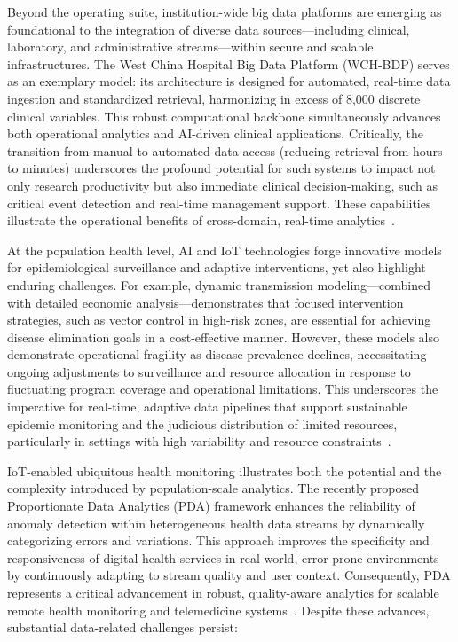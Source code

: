 \documentclass[sigconf]{acmart}
\begin{document}
Beyond the operating suite, institution-wide big data platforms are emerging as foundational to the integration of diverse data sources—including clinical, laboratory, and administrative streams—within secure and scalable infrastructures. The West China Hospital Big Data Platform (WCH-BDP) serves as an exemplary model: its architecture is designed for automated, real-time data ingestion and standardized retrieval, harmonizing in excess of 8,000 discrete clinical variables. This robust computational backbone simultaneously advances both operational analytics and AI-driven clinical applications. Critically, the transition from manual to automated data access (reducing retrieval from hours to minutes) underscores the profound potential for such systems to impact not only research productivity but also immediate clinical decision-making, such as critical event detection and real-time management support. These capabilities illustrate the operational benefits of cross-domain, real-time analytics~\cite{ref84}.

At the population health level, AI and IoT technologies forge innovative models for epidemiological surveillance and adaptive interventions, yet also highlight enduring challenges. For example, dynamic transmission modeling—combined with detailed economic analysis—demonstrates that focused intervention strategies, such as vector control in high-risk zones, are essential for achieving disease elimination goals in a cost-effective manner. However, these models also demonstrate operational fragility as disease prevalence declines, necessitating ongoing adjustments to surveillance and resource allocation in response to fluctuating program coverage and operational limitations. This underscores the imperative for real-time, adaptive data pipelines that support sustainable epidemic monitoring and the judicious distribution of limited resources, particularly in settings with high variability and resource constraints~\cite{ref61,ref63}.

IoT-enabled ubiquitous health monitoring illustrates both the potential and the complexity introduced by population-scale analytics. The recently proposed Proportionate Data Analytics (PDA) framework enhances the reliability of anomaly detection within heterogeneous health data streams by dynamically categorizing errors and variations. This approach improves the specificity and responsiveness of digital health services in real-world, error-prone environments by continuously adapting to stream quality and user context. Consequently, PDA represents a critical advancement in robust, quality-aware analytics for scalable remote health monitoring and telemedicine systems~\cite{ref79}. Despite these advances, substantial data-related challenges persist:
\end{document}

